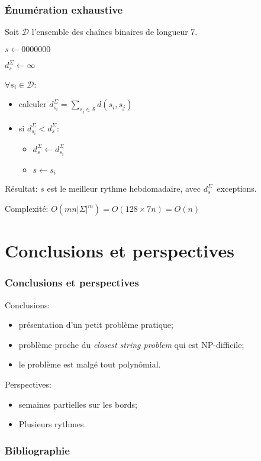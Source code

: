 \documentclass[table]{beamer}
\newcommand{\+}{\cellcolor[gray]{1}\bfseries}
\newcommand{\<}{\cellcolor[gray]{0.8}\rmfamily\itshape}
\def\S{\mathcal{S}}
\newcommand*{\foreign}[2][english]{%
    \emph{\foreignlanguage{#1}{#2}}%
}
\begin{document}
\begin{frame}
  \frametitle{Énumération exhaustive}

  Soit $\mathcal{D}$ l'ensemble des chaînes binaires de longueur 7.

  $s \leftarrow 0000000$

  $d^\Sigma_s \leftarrow \infty$

  $\forall s_i \in \mathcal{D}$: 
  \begin{itemize}
  \item calculer
    \begin{math}
      \displaystyle
      d^\Sigma_{s_i} = \sum_{s_j\in\S} d(s_i, s_j)
    \end{math} 
  \item si $d^\Sigma_{s_i} < d^\Sigma_s$:
    \begin{itemize}
    \item $d^\Sigma_s \leftarrow d^\Sigma_{s_i}$
    \item $s \leftarrow s_i$
    \end{itemize}
  \end{itemize}

  Résultat: $s$ est le meilleur rythme hebdomadaire, avec
  $d^\Sigma_s$~exceptions.\pause

  \vspace{2ex}

  Complexité: $O(mn|\Sigma|^m) = O(128 \times 7n) = O(n)$
\end{frame}

\section{Conclusions et perspectives}

\begin{frame}
  \frametitle{Conclusions et perspectives}

  Conclusions:
  \begin{itemize}
  \item présentation d'un petit problème pratique;
  \item problème proche du \foreign{closest string problem} qui est
    NP-difficile;
  \item le problème est malgé tout polynômial.
  \end{itemize}\pause

  Perspectives:
  \begin{itemize}
  \item semaines partielles sur les bords;
  \item Plusieurs rythmes.
  \end{itemize}
\end{frame}

\begin{frame}
  \titlepage
\end{frame}

\appendix

\begin{frame}[allowframebreaks]
  \frametitle{Bibliographie}
  
  
\end{frame}
\end{document}
